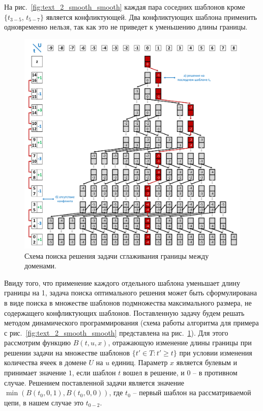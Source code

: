 На рис.~\ref{fig:text_2_smooth_smooth} каждая пара соседних шаблонов кроме $\{ t_{3-5}$, $t_{5-7} \}$ является конфликтующей.
Два конфликтующих шаблона применить одновременно нельзя, так как это не приведет к уменьшению длины границы.

\begin{figure}[!ht]
\centering
\includegraphics[width=1.0\textwidth]{./pics/text_2_smooth/smooth-scheme-cut.pdf}
\singlespacing
{}\caption{Схема поиска решения задачи сглаживания границы между доменами.}
\label{fig:text_2_smooth_smooth_scheme}
\end{figure}

Ввиду того, что применение каждого отдельного шаблона уменьшает длину границы на 1, задача поиска оптимального решения может быть сформулирована в виде поиска в множестве шаблонов подмножества максимального размера, не содержащего конфликтующих шаблонов.
Поставленную задачу будем решать методом динамического программирования (схема работы алгоритма для примера с рис.~\ref{fig:text_2_smooth_smooth} представлена на рис.~\ref{fig:text_2_smooth_smooth_scheme}).
Для этого рассмотрим функцию $B(t, u, x)$, отражающую изменение длины границы при решении задачи на множестве шаблонов $\{ t' \in T : t' \ge t \}$ при условии изменения количества ячеек в домене $U$ на $u$ единиц.
Параметр $x$ является булевым и принимает значение $1$, если шаблон $t$ вошел в решение, и $0$ -- в противном случае.
Решением поставленной задачи является значение $\min(B(t_0, 0, 1), B(t_0, 0, 0))$, где $t_0$ -- первый шаблон на рассматриваемой цепи, в нашем случае это $t_{0-2}$.

